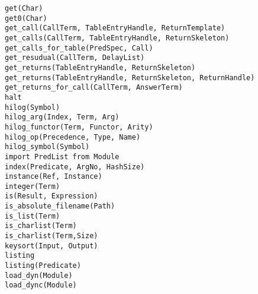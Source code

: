\begin{tabbing}
 \> {\tt get(Char)}		\>					\\
 \> {\tt get0(Char)}		\>					\\
 \> {\tt get\_call(CallTerm, TableEntryHandle, ReturnTemplate)}	\>	\\
 \> {\tt get\_calls(CallTerm, TableEntryHandle, ReturnSkeleton)} \>	\\
 \> {\tt get\_calls\_for\_table(PredSpec, Call)} \>			\\
 \> {\tt get\_resudual(CallTerm, DelayList)}	 \>			\\
 \> {\tt get\_returns(TableEntryHandle, ReturnSkeleton)} \>		\\
 \> {\tt get\_returns(TableEntryHandle, ReturnSkeleton, ReturnHandle)} \> \\
 \> {\tt get\_returns\_for\_call(CallTerm, AnswerTerm)} \>		\\
 \> {\tt halt}			\>					\\
 \> {\tt hilog(Symbol)}		\>					\\
 \> {\tt hilog\_arg(Index, Term, Arg)}	\>				\\
 \> {\tt hilog\_functor(Term, Functor, Arity)} \>			\\
 \> {\tt hilog\_op(Precedence, Type, Name)} \>				\\
 \> {\tt hilog\_symbol(Symbol)}	\>					\\
 \> {\tt import PredList from Module} \>				\\
 \> {\tt index(Predicate, ArgNo, HashSize)} \>				\\
 \> {\tt instance(Ref, Instance)} \>					\\
 \> {\tt integer(Term)}		\>					\\
 \> {\tt is(Result, Expression)} \>					\\
 \> {\tt is\_absolute\_filename(Path)} \>				\\
 \> {\tt is\_list(Term)}	\>					\\
 \> {\tt is\_charlist(Term)}	\>					\\
 \> {\tt is\_charlist(Term,Size)}	\>				\\
 \> {\tt keysort(Input, Output)} \>					\\
 \> {\tt listing}		\>					\\
 \> {\tt listing(Predicate)}	\>					\\
 \> {\tt load\_dyn(Module)}	\>					\\
 \> {\tt load\_dync(Module)}	\>					\\

\end{tabbing}
